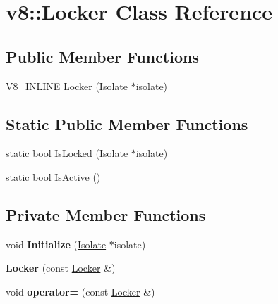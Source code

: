 \hypertarget{classv8_1_1_locker}{}\section{v8\+:\+:Locker Class Reference}
\label{classv8_1_1_locker}
\subsection*{Public Member Functions}
\begin{DoxyCompactItemize}
\item 
V8\+\_\+\+I\+N\+L\+I\+NE \hyperlink{classv8_1_1_locker_a9f41151c92493a27d6724676fc774b51}{Locker} (\hyperlink{classv8_1_1_isolate}{Isolate} $\ast$isolate)
\end{DoxyCompactItemize}
\subsection*{Static Public Member Functions}
\begin{DoxyCompactItemize}
\item 
static bool \hyperlink{classv8_1_1_locker_a3ae563ffdd9e8b5a0100f0ae756b3a6a}{Is\+Locked} (\hyperlink{classv8_1_1_isolate}{Isolate} $\ast$isolate)
\item 
static bool \hyperlink{classv8_1_1_locker_a19d2b640f2f9b3dd0ec3a6c09a0442ed}{Is\+Active} ()
\end{DoxyCompactItemize}
\subsection*{Private Member Functions}
\begin{DoxyCompactItemize}
\item 
void {\bfseries Initialize} (\hyperlink{classv8_1_1_isolate}{Isolate} $\ast$isolate)\hypertarget{classv8_1_1_locker_a0e07d8e2888b4489b73cfbf7e98e389c}{}\label{classv8_1_1_locker_a0e07d8e2888b4489b73cfbf7e98e389c}

\item 
{\bfseries Locker} (const \hyperlink{classv8_1_1_locker}{Locker} \&)\hypertarget{classv8_1_1_locker_a109234b888861166ab5fa97f68021deb}{}\label{classv8_1_1_locker_a109234b888861166ab5fa97f68021deb}

\item 
void {\bfseries operator=} (const \hyperlink{classv8_1_1_locker}{Locker} \&)\hypertarget{classv8_1_1_locker_ae06180c0ba39cdc842b0495a0a068f00}{}\label{classv8_1_1_locker_ae06180c0ba39cdc842b0495a0a068f00}

\end{DoxyCompactItemize}
